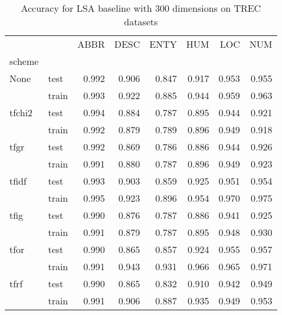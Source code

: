 \begin{table}[h]
\begin{center}

\begin{tabular}{llrrrrrr}
\toprule
{} &  &  ABBR &  DESC &  ENTY &  HUM &  LOC &  NUM \\
scheme &  &       &       &       &      &      &      \\
\midrule
None & test &     0.992 &     0.906 &     0.847 &    0.917 &    0.953 &    0.955 \\
{} & train &     0.993 &     0.922 &     0.885 &    0.944 &    0.959 &    0.963 \\
tfchi2 & test &     0.994 &     0.884 &     0.787 &    0.895 &    0.944 &    0.921 \\
{} & train &     0.992 &     0.879 &     0.789 &    0.896 &    0.949 &    0.918 \\
tfgr & test &     0.992 &     0.869 &     0.786 &    0.886 &    0.944 &    0.926 \\
{} & train &     0.991 &     0.880 &     0.787 &    0.896 &    0.949 &    0.923 \\
tfidf & test &     0.993 &     0.903 &     0.859 &    0.925 &    0.951 &    0.954 \\
{} & train &     0.995 &     0.923 &     0.896 &    0.954 &    0.970 &    0.975 \\
tfig & test &     0.990 &     0.876 &     0.787 &    0.886 &    0.941 &    0.925 \\
{} & train &     0.991 &     0.879 &     0.787 &    0.895 &    0.948 &    0.930 \\
tfor & test &     0.990 &     0.865 &     0.857 &    0.924 &    0.955 &    0.957 \\
{} & train &     0.991 &     0.943 &     0.931 &    0.966 &    0.965 &    0.971 \\
tfrf & test &     0.990 &     0.865 &     0.832 &    0.910 &    0.942 &    0.949 \\
{} & train &     0.991 &     0.906 &     0.887 &    0.935 &    0.949 &    0.953 \\
\bottomrule
\end{tabular}

\caption[Accuracy for LSA baseline with 300 dimensions on TREC datasets]{Accuracy for LSA baseline with 300 dimensions on TREC datasets}
\label{tab:lsa:resuts:abs:300:TREC}
\end{center}
\end{table}





